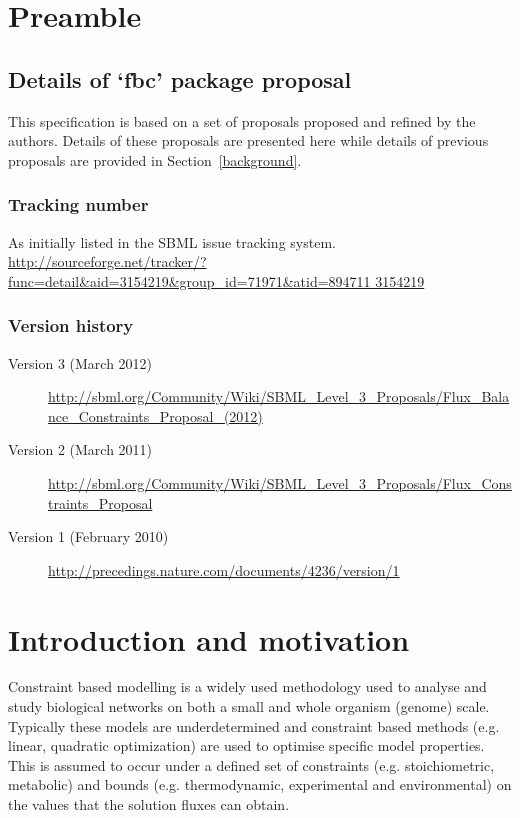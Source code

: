 
\section{Preamble}
\label{preamble}

\subsection{ Details of `fbc' package proposal }
This specification is based on a set of proposals proposed and refined by the authors. Details of these proposals are presented here while details of previous proposals are provided in Section~\ref{background}.

\subsubsection{ Tracking number }
As initially listed in the SBML issue tracking system. \url{http://sourceforge.net/tracker/?func=detail&aid=3154219&group_id=71971&atid=894711
3154219}

\subsubsection{ Version history }
\begin{description}
  \item[Version 3 (March 2012)]
  \item [] \url{http://sbml.org/Community/Wiki/SBML_Level_3_Proposals/Flux_Balance_Constraints_Proposal_(2012)}
  \item[Version 2 (March 2011)]
  \item [] \url{http://sbml.org/Community/Wiki/SBML_Level_3_Proposals/Flux_Constraints_Proposal}
  \item[Version 1 (February 2010)]
  \item [] \url{http://precedings.nature.com/documents/4236/version/1}
\end{description}


\section{ Introduction and motivation }
\label{intro}

Constraint based modelling is a widely used methodology used to analyse and study biological networks on both a small and whole organism (genome) scale. Typically these models are underdetermined and constraint based methods (e.g. linear, quadratic optimization) are used to optimise specific model properties. This is assumed to occur under a defined set of constraints (e.g. stoichiometric, metabolic) and bounds (e.g. thermodynamic, experimental and environmental) on the values that the solution fluxes can obtain.

